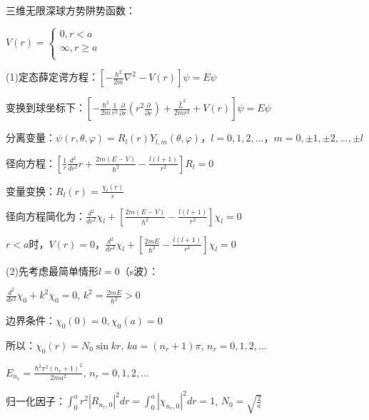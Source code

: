 
三维无限深球方势阱势函数：

\begin{center}
$V(r) = \left\{ \begin{array}{l}
 0,r < a \\
 \infty ,r \ge a \\
 \end{array} \right.$
\end{center}

(1)定态薛定谔方程：$\left[ { - \frac{{\hbar ^2 }}{{2m}}\nabla ^2  - V\left( r \right)} \right]\psi  = E\psi $

变换到球坐标下：$\left[ { - \frac{{\hbar ^2 }}{{2m}}\frac{1}{{r^2 }}\frac{\partial }{{\partial r}}\left( {r^2 \frac{\partial }{{\partial r}}} \right) + \frac{{\widehat L^2 }}{{2mr^2 }} + V(r)} \right]\psi  = E\psi $

分离变量：$\psi \left( {r,\theta ,\varphi } \right) = R_l \left( r \right)Y_{l,m} \left( {\theta ,\varphi } \right)$，$l = 0,1,2,...$，$m = 0, \pm 1, \pm 2,..., \pm l$

径向方程：$\left[ {\frac{1}{r}\frac{{d^2 }}{{dr^2 }}r + \frac{{2m\left( {E - V} \right)}}{{\hbar ^2 }} - \frac{{l\left( {l + 1} \right)}}{{r^2 }}} \right]R_l  = 0$

变量变换：$R_l (r) = \frac{{\chi _l (r)}}{r}$

径向方程简化为：$\frac{{d^2 }}{{dr^2 }}\chi _l  + \left[ {\frac{{2m\left( {E - V} \right)}}{{\hbar ^2 }} - \frac{{l\left( {l + 1} \right)}}{{r^2 }}} \right]\chi _l  = 0$

$r<a$时，$V(r) = 0$，$\frac{{d^2 }}{{dr^2 }}\chi _l  + \left[ {\frac{{2mE}}{{\hbar ^2 }} - \frac{{l\left( {l + 1} \right)}}{{r^2 }}} \right]\chi _l  = 0$

(2)先考虑最简单情形$l=0$（s波）：

\begin{center}
$\frac{{d^2 }}{{dr^2 }}\chi _0  + k^2 \chi _0  = 0$, $k^2  = \frac{{2mE}}{{\hbar ^2 }} > 0$
\end{center}

边界条件：$\chi _0 (0) = 0,\chi _0 (a) = 0$

所以：$\chi _0 (r) = N_0 \sin kr$, $ka = (n_r  + 1)\pi $, $n_r  = 0,1,2,...$

$E_{n_r }  = \frac{{\hbar ^2 \pi ^2 \left( {n_r  + 1} \right)^2 }}{{2ma^2 }}$, $n_r  = 0,1,2,...$

归一化因子：$\int_0^a {r^2 \left| {R_{n_r ,0} } \right|^2 dr}  = \int_0^a {\left| {\chi _{n_r ,0} } \right|^2 dr}  = 1$, $N_0  = \sqrt {\frac{2}{a}} $


